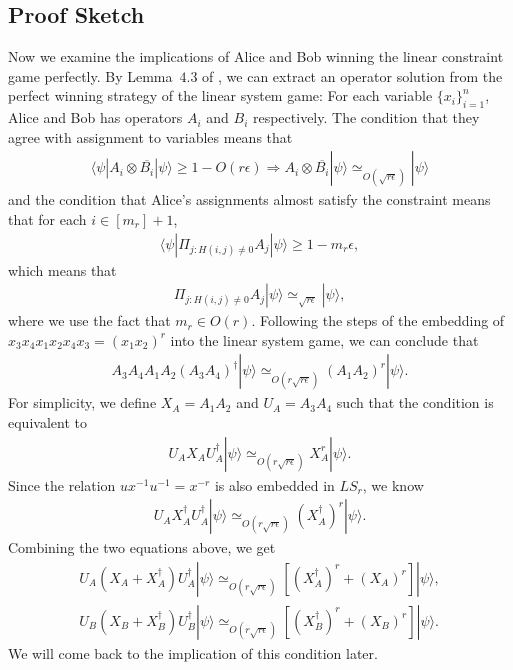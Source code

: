 \documentclass[11pt,letterpaper]{article}
\newcommand{\ket}[1]{|#1\rangle}
\newcommand{\bra}[1]{\langle#1|}
\newcommand{\ct}{^{\dagger}}
\newcommand{\1}{\mathbb{1}}
\newcommand{\appd}[1]{\simeq_{#1}}
\theoremstyle{definition}
\begin{document}
\subsection{Proof Sketch}
Now we examine the implications of Alice and Bob winning the linear constraint game perfectly.
By Lemma~$4.3$ of \cite{coladan2017}, we can extract an operator solution from the perfect winning strategy 
of the linear system game: 
For each variable $\{ x_i \}_{i=1}^n$, Alice and Bob has operators $A_i$ and $B_i$ respectively.
The condition that they agree with assignment to variables means that 
\begin{align}
	\bra{\psi} A_i \otimes \overline{B_i} \ket{\psi} \geq 1 - O(r\epsilon) \Rightarrow 
	A_i \otimes \overline{B_i} \ket{\psi} \appd{O(\sqrt{r\epsilon})} \ket{\psi}
\end{align}
and the condition that Alice's assignments almost satisfy the constraint means that 
for each $i \in [m_r]+1$,
\begin{align}
\bra{\psi} \Pi_{j:H(i,j) \neq 0} A_j \ket{\psi} \geq 1- m_r \epsilon,
\end{align}
which means that 
\begin{align}
	\Pi_{j:H(i,j) \neq 0} A_j \ket{\psi} \appd{\sqrt{r\epsilon}} \ket{\psi},
\end{align}
where we use the fact that $m_r \in O(r)$.
Following the steps of the embedding of $x_3x_4x_1x_2x_4x_3 = (x_1x_2)^r$ into the linear system game,
we can conclude that 
\begin{align}
	A_3A_4 A_1A_2 (A_3A_4)^\dagger \ket{\psi}\appd{O(r\sqrt{r\epsilon})} (A_1A_2)^r \ket{\psi}.
\end{align}
For simplicity, we define $X_A = A_1A_2$ and $U_A=A_3A_4$ such that
the condition is equivalent to
\begin{align}
	\label{eq:ux_relation}
	U_AX_AU_A^\dagger \ket{\psi} \appd{O(r\sqrt{r\epsilon})} X_A^r \ket{\psi}.
\end{align}
Since the relation $ux^{-1}u^{-1} = x^{-r}$ is also embedded in $LS_r$, we know
\begin{align}
	U_AX_A\ct U_A\ct \ket{\psi}\appd{O(r\sqrt{r\epsilon})} (X_A\ct)^r \ket{\psi}.
\end{align}
Combining the two equations above, we get 
\begin{align}
	U_A(X_A+X_A\ct)U_A\ct \ket{\psi} \appd{O(r\sqrt{r\epsilon})} [(X_A\ct)^r+(X_A)^r] \ket{\psi},\\
	U_B(X_B+X_B\ct)U_B\ct \ket{\psi} \appd{O(r\sqrt{r\epsilon})} [(X_B\ct)^r+(X_B)^r] \ket{\psi}.
\end{align}
We will come back to the implication of this condition later.
\end{document}
